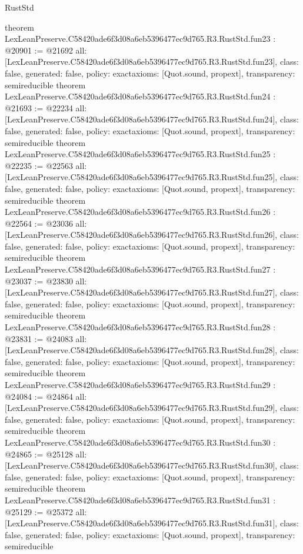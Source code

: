 \begin{lexlean}{RustStd}
\begin{coremodule}
{}
theorem LexLeanPreserve.C58420ade6f3d08a6eb5396477ec9d765.R3.RustStd.fun23 : @20901 := @21692 {
  all: [LexLeanPreserve.C58420ade6f3d08a6eb5396477ec9d765.R3.RustStd.fun23],
  class: false,
  generated: false,
  policy: exact{axioms: [Quot.sound, propext]},
  transparency: semireducible
}
theorem LexLeanPreserve.C58420ade6f3d08a6eb5396477ec9d765.R3.RustStd.fun24 : @21693 := @22234 {
  all: [LexLeanPreserve.C58420ade6f3d08a6eb5396477ec9d765.R3.RustStd.fun24],
  class: false,
  generated: false,
  policy: exact{axioms: [Quot.sound, propext]},
  transparency: semireducible
}
theorem LexLeanPreserve.C58420ade6f3d08a6eb5396477ec9d765.R3.RustStd.fun25 : @22235 := @22563 {
  all: [LexLeanPreserve.C58420ade6f3d08a6eb5396477ec9d765.R3.RustStd.fun25],
  class: false,
  generated: false,
  policy: exact{axioms: [Quot.sound, propext]},
  transparency: semireducible
}
theorem LexLeanPreserve.C58420ade6f3d08a6eb5396477ec9d765.R3.RustStd.fun26 : @22564 := @23036 {
  all: [LexLeanPreserve.C58420ade6f3d08a6eb5396477ec9d765.R3.RustStd.fun26],
  class: false,
  generated: false,
  policy: exact{axioms: [Quot.sound, propext]},
  transparency: semireducible
}
theorem LexLeanPreserve.C58420ade6f3d08a6eb5396477ec9d765.R3.RustStd.fun27 : @23037 := @23830 {
  all: [LexLeanPreserve.C58420ade6f3d08a6eb5396477ec9d765.R3.RustStd.fun27],
  class: false,
  generated: false,
  policy: exact{axioms: [Quot.sound, propext]},
  transparency: semireducible
}
theorem LexLeanPreserve.C58420ade6f3d08a6eb5396477ec9d765.R3.RustStd.fun28 : @23831 := @24083 {
  all: [LexLeanPreserve.C58420ade6f3d08a6eb5396477ec9d765.R3.RustStd.fun28],
  class: false,
  generated: false,
  policy: exact{axioms: [Quot.sound, propext]},
  transparency: semireducible
}
theorem LexLeanPreserve.C58420ade6f3d08a6eb5396477ec9d765.R3.RustStd.fun29 : @24084 := @24864 {
  all: [LexLeanPreserve.C58420ade6f3d08a6eb5396477ec9d765.R3.RustStd.fun29],
  class: false,
  generated: false,
  policy: exact{axioms: [Quot.sound, propext]},
  transparency: semireducible
}
theorem LexLeanPreserve.C58420ade6f3d08a6eb5396477ec9d765.R3.RustStd.fun30 : @24865 := @25128 {
  all: [LexLeanPreserve.C58420ade6f3d08a6eb5396477ec9d765.R3.RustStd.fun30],
  class: false,
  generated: false,
  policy: exact{axioms: [Quot.sound, propext]},
  transparency: semireducible
}
theorem LexLeanPreserve.C58420ade6f3d08a6eb5396477ec9d765.R3.RustStd.fun31 : @25129 := @25372 {
  all: [LexLeanPreserve.C58420ade6f3d08a6eb5396477ec9d765.R3.RustStd.fun31],
  class: false,
  generated: false,
  policy: exact{axioms: [Quot.sound, propext]},
  transparency: semireducible
}
\end{coremodule}
\end{lexlean}
